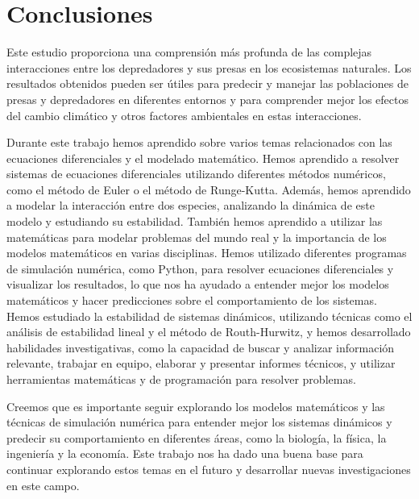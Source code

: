 \documentclass{wscpaperproc}
\theoremstyle{wsc}
\begin{document}
\section*{Conclusiones}
Este estudio proporciona una comprensi\'on más profunda de las complejas interacciones entre los depredadores y sus presas en
los ecosistemas naturales. Los resultados obtenidos pueden ser \'utiles para predecir y manejar las poblaciones de presas y
depredadores en diferentes entornos y para comprender mejor los efectos del cambio clim\'atico y otros factores ambientales
en estas interacciones. \par
Durante este trabajo hemos aprendido sobre varios temas relacionados con las ecuaciones diferenciales
y el modelado matemático. Hemos aprendido a resolver sistemas de ecuaciones diferenciales utilizando diferentes
métodos numéricos, como el método de Euler o el método de Runge-Kutta. Además, hemos aprendido a modelar la interacción entre
dos especies, analizando la dinámica de este modelo y estudiando su estabilidad. También hemos aprendido a utilizar las matemáticas
para modelar problemas del mundo real y la importancia de los modelos matemáticos en varias disciplinas. Hemos utilizado diferentes
programas de simulación numérica, como Python, para resolver ecuaciones diferenciales y visualizar los resultados, lo que
nos ha ayudado a entender mejor los modelos matemáticos y hacer predicciones sobre el comportamiento de los sistemas. Hemos estudiado
la estabilidad de sistemas dinámicos, utilizando técnicas como el análisis de estabilidad lineal y el método de Routh-Hurwitz, y hemos
desarrollado habilidades investigativas, como la capacidad de buscar y analizar información relevante, trabajar en equipo, elaborar y
presentar informes técnicos, y utilizar herramientas matemáticas y de programación para resolver problemas. \par
Creemos que es importante seguir explorando los modelos matemáticos y las técnicas de simulación numérica para entender mejor
los sistemas dinámicos y predecir su comportamiento en diferentes áreas, como la biología, la física, la ingeniería y
la economía. Este trabajo nos ha dado una buena base para continuar explorando estos temas en el futuro y desarrollar
nuevas investigaciones en este campo.


\end{document}
